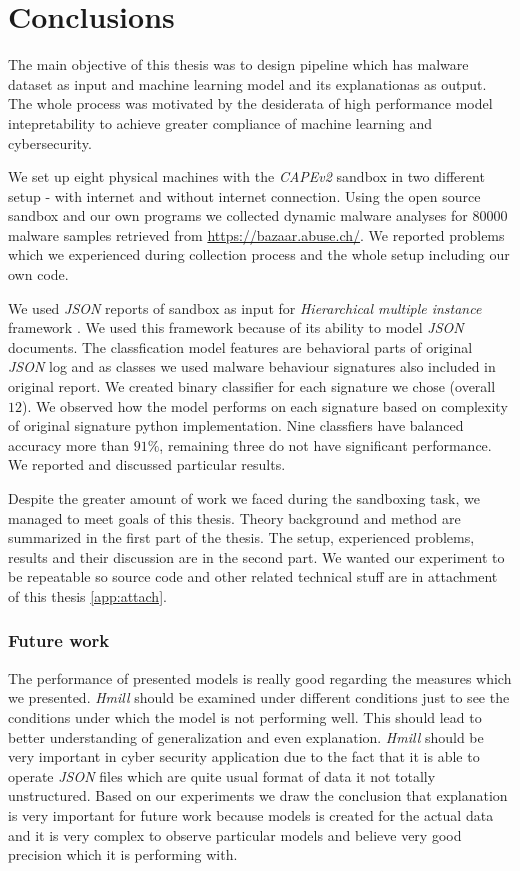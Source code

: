 \chapter{Conclusions} \label{chap:concl}
The main objective of this thesis was to design pipeline which has malware dataset as input and machine learning model and its explanationas as output. The whole process was motivated by the desiderata of high performance model intepretability to achieve greater compliance of machine learning and cybersecurity.

We set up eight physical machines with the \emph{CAPEv2} sandbox in two different setup - with internet and without internet connection. Using the open source sandbox and our own programs we collected dynamic malware analyses for $80 000$ malware samples retrieved from \url{https://bazaar.abuse.ch/}. We reported problems which we experienced during collection process and the whole setup including our own code.

We used \emph{JSON} reports of sandbox as input for \emph{Hierarchical multiple instance} framework \cite{Mandlik2020}. We used this framework because of its ability to model \emph{JSON} documents. The classfication model features are behavioral parts of original \emph{JSON} log and as classes we used malware behaviour signatures also included in original report. We created binary classifier for each signature we chose (overall $12$). We observed how the model performs on each signature based on complexity of original signature python implementation. Nine classfiers have balanced accuracy more than $91\%$, remaining three do not have significant performance. We reported and discussed particular results.

Despite the greater amount of work we faced during the sandboxing task, we managed to meet goals of this thesis. Theory background and method are summarized in the first part of the thesis. The setup, experienced problems, results and their discussion are in the second part. We wanted our experiment to be repeatable so source code and other related technical stuff are in attachment of this thesis \ref{app:attach}.

\subsection*{Future work}


The performance of presented models is really good regarding the measures which we presented. \emph{Hmill} should be examined under different conditions just to see the conditions under which the model is not performing well. This should lead to better understanding of generalization and even explanation. \emph{Hmill} should be very important in cyber security application due to the fact that it is able to operate \emph{JSON} files which are quite usual format of data it not totally unstructured. Based on our experiments we draw the conclusion that explanation is very important for future work because models is created for the actual data and it is very complex to observe particular models and believe very good precision which it is performing with.

